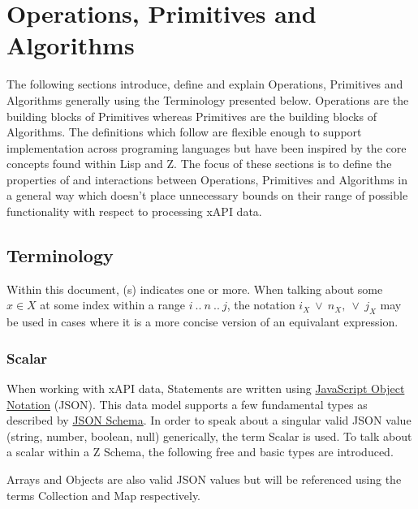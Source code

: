 \documentclass[../main.tex]{subfiles}
\begin{document}
\section{Operations, Primitives and Algorithms}
The following sections introduce, define and explain Operations, Primitives and Algorithms generally using the Terminology presented below. Operations are the building blocks of Primitives whereas Primitives are the building blocks of Algorithms. The definitions which follow are flexible enough to support implementation across programing languages but have been inspired by the core concepts found within Lisp and Z. The focus of these sections is to define the properties of and interactions between Operations, Primitives and Algorithms in a general way which doesn't place unnecessary bounds on their range of possible functionality with respect to processing xAPI data.

\subsection{Terminology}

Within this document, (s) indicates one or more.
When talking about some $x \in X$ at some index within a range $i~..~n~..~j$, the notation $i_{X} ~\lor ~n_{X}, ~\lor ~j_{X}$ may be used in cases where it is a more concise version of an equivalant expression.

\subsubsection{Scalar}
When working with xAPI data, Statements are written using \href{https://www.json.org/}{JavaScript Object Notation} (JSON).
This data model supports a few fundamental types as described by \href{https://json-schema.org/understanding-json-schema/reference/type.html}{JSON Schema}.
In order to speak about a singular valid JSON value (string, number, boolean, null) generically, the term Scalar is used.
To talk about a scalar within a Z Schema, the following free and basic types are introduced.
Arrays and Objects are also valid JSON values but will be referenced using the terms Collection and Map respectively.
\end{document}
